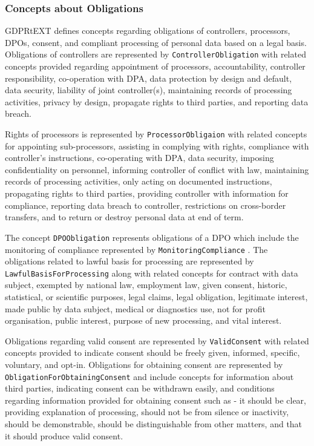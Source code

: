 \subsubsection{Concepts about Obligations}
GDPRtEXT defines concepts regarding obligations of controllers, processors, DPOs, consent, and compliant processing of personal data based on a legal basis. Obligations of controllers are represented by \texttt{ControllerObligation} with related concepts provided regarding  appointment of processors, accountability, controller responsibility, co-operation with DPA, data protection by design and default, data security, liability of joint controller(s), maintaining records of processing activities, privacy by design, propagate rights to third parties, and reporting data breach.

Rights of processors is represented by \texttt{ProcessorObligaion} with related concepts for appointing sub-processors, assisting in complying with rights, compliance with controller's instructions, co-operating with DPA, data security, imposing confidentiality on personnel, informing controller of conflict with law, maintaining records of processing activities, only acting on documented instructions, propagating rights to third parties, providing controller with information for compliance, reporting data breach to controller, restrictions on cross-border transfers, and to return or destroy personal data at end of term.

The concept \texttt{DPOObligation} represents obligations of a DPO which include the monitoring of compliance represented by \texttt{MonitoringCompliance} . The obligations related to lawful basis for processing are represented by \texttt{LawfulBasisForProcessing} along with related concepts for contract with data subject, exempted by national law, employment law, given consent, historic, statistical, or scientific purposes, legal claims, legal obligation, legitimate interest, made public by data subject, medical or diagnostics use, not for profit organisation, public interest, purpose of new processing, and vital interest.

Obligations regarding valid consent are represented by \texttt{ValidConsent} with related concepts provided to indicate consent should be freely given, informed, specific, voluntary, and opt-in. 
Obligations for obtaining consent are represented by \texttt{ObligationForObtainingConsent} and include concepts for information about third parties, indicating consent can be withdrawn easily, and conditions regarding information provided for obtaining consent such as - it should be clear, providing explanation of processing, should not be from silence or inactivity, should be demonstrable, should be distinguishable from other matters, and that it should produce valid consent.

